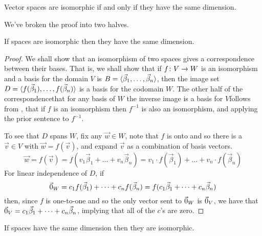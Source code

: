 \begin{theorem} \label{th:NDimSpaceIsoRN}
Vector spaces are isomorphic if and only if they have the same dimension.
\end{theorem}

We've broken the proof into two halves.

\begin{lemma}   \label{lem:IsoImpliesSameDim}
If spaces are isomorphic then they have the same dimension.
\end{lemma}

\begin{proof}
We shall show that an isomorphism of two spaces gives a correspondence 
between their bases.
That is, we shall show that if \( \mbox{$f\colon V\to W$} \) is an isomorphism and
a basis for the domain $V$ is 
\( B=\langle\vec{\beta}_1,\dots,\vec{\beta}_n\rangle \),
then the image set
\( D=\langle f(\vec{\beta}_1),\dots,f(\vec{\beta}_n)\rangle \)
is a basis for the codomain \( W \).
The other half of the correspondence\Dash that  
for any basis of $W$ the inverse image is a 
basis for $V$\Dash follows from
, that if $f$ is an isomorphism 
then $f^{-1}$ is also an isomorphism, 
and applying the prior sentence to $f^{-1}$.

To see that \( D \) spans \( W \), fix any \( \vec{w}\in W \),
note that \( f \) is onto and so there is a \( \vec{v}\in V \) with
\( \vec{w}=f(\vec{v}) \), and expand \( \vec{v} \) as a combination of
basis vectors.
\begin{equation*}
  \vec{w}=f(\vec{v})
  =f(v_1\vec{\beta}_1+\dots+v_n\vec{\beta}_n)  
  =v_1\cdot f(\vec{\beta}_1)+\dots+v_n\cdot f(\vec{\beta}_n)
\end{equation*}
For linear independence of $D$, if
\begin{equation*}
  \vec{0}_W
  =c_1f(\vec{\beta}_1)+\dots+c_nf(\vec{\beta}_n)  
  =f(c_1\vec{\beta}_1+\dots+c_n\vec{\beta}_n)
\end{equation*}
then, since \( f \) is one-to-one and so the only vector sent to 
\( \vec{0}_W \) is \( \vec{0}_V \), we have that
\( \vec{0}_V=c_1\vec{\beta}_1+\dots+c_n\vec{\beta}_n \),
implying that all of the \( c \)'s are zero.
\end{proof}

\begin{lemma} \label{lem:EqDimImpIso}
If spaces have the same dimension then they are isomorphic. 
\end{lemma}

